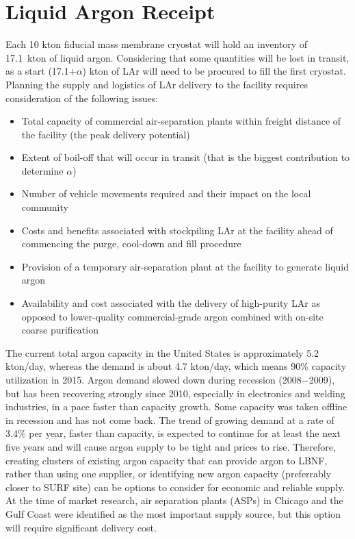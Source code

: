 \section{Liquid Argon Receipt}

Each 10 kton fiducial mass membrane cryostat will hold an inventory 
of 17.1~kton of liquid argon. Considering that some quantities will 
be lost in transit, as a start (17.1+$\alpha$) kton of LAr will need to be 
procured to fill the first cryostat. Planning the supply and logistics 
of LAr delivery to the facility requires consideration of the following issues:

\begin{itemize}
\item  Total capacity of commercial air-separation plants within freight 
distance of the facility (the peak delivery potential)
\item Extent of boil-off that will occur in transit (that is the biggest 
contribution to determine $\alpha$)
\item Number of vehicle movements required and their impact on the local community
\item Costs and benefits associated with stockpiling LAr at the facility
ahead of commencing the purge, cool-down and fill procedure
\item Provision of a temporary air-separation plant at the facility 
to generate liquid argon
\item Availability and cost associated with the delivery of high-purity 
LAr as opposed to lower-quality commercial-grade argon combined with 
on-site coarse purification
\end{itemize}

The current total argon capacity in the United States is approximately 5.2 kton/day, 
whereas the demand is about 4.7 kton/day, which means 90\% capacity utilization in 
2015. Argon demand slowed down during recession (2008$-$2009), but has been 
recovering strongly since 2010, especially in electronics and welding industries, 
in a pace faster than capacity growth. Some capacity was taken offline in recession 
and has not come back. The trend of growing demand at a rate of 3.4\% per year, 
faster than capacity, is expected to continue for at least the next five years and 
will cause argon supply to be tight and prices to rise. Therefore, creating clusters 
of existing argon capacity that can provide argon to LBNF, rather than using one 
supplier, or identifying new argon capacity (preferrably closer to SURF site) can 
be options to consider for economic and reliable supply. At the time of market 
research, air separation plants (ASPs) in Chicago and the Gulf Coast were 
identified as the most important supply source, but this option will 
require significant delivery cost.

